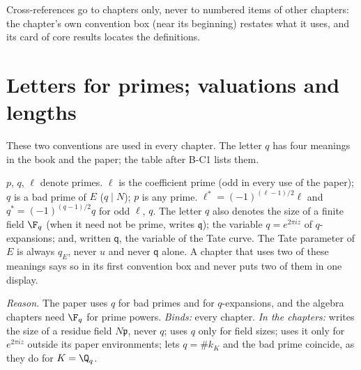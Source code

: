 Cross-references go to chapters only, never to numbered items of other chapters: the chapter's own convention box (near its
beginning) restates what it uses, and its card of core results locates the definitions.

\section{Letters for primes; valuations and lengths}\label{sec:notation:primes}

These two conventions are used in every chapter. The letter $q$ has four meanings in the book and the paper; the table after
B-C1 lists them.

\begin{convention}\label{conv:notation:bc1}
$p$, $q$, $\ell$ denote primes. $\ell$ is the coefficient prime (odd in every use of the paper); $q$ is a bad prime of $E$
($q\mid N$); $p$ is any prime. $\ell^*=(-1)^{(\ell-1)/2}\ell$ and $q^*=(-1)^{(q-1)/2}q$ for odd $\ell$, $q$. The letter $q$ also
denotes the size of a finite field $\F_q$ (when it need not be prime,  writes $\mathfrak q$); the variable
$q=e^{2\pi iz}$ of $q$-expansions; and, written $\mathsf q$, the variable of the Tate curve. The Tate parameter of $E$ is always
$q_E$, never $u$ and never $\mathsf q$ alone. A chapter that uses two of these meanings says so in its first convention box and
never puts two of them in one display.
\end{convention}

\noindent\emph{Reason.} The paper uses $q$ for bad primes and for $q$-expansions, and the algebra chapters need $\F_q$ for
prime powers. \emph{Binds:} every chapter. \emph{In the chapters:}  writes the size of a residue field
$N\mathfrak p$, never $q$;  uses $q$ only for field sizes;  uses it only for $e^{2\pi iz}$
outside its paper environments;  lets $q=\#k_K$ and the bad prime coincide, as they do for $K=\Q_q$.

